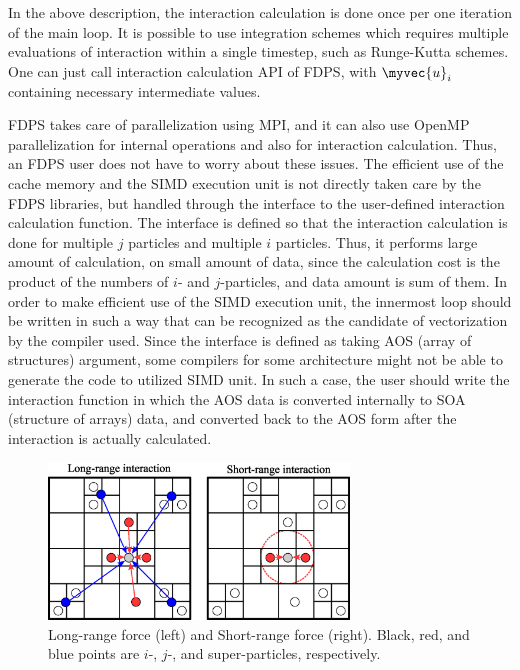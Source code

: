 In the above description, the interaction calculation is done once per
one iteration of the main loop. It is possible to use integration
schemes which requires multiple evaluations of interaction within a
single timestep, such as Runge-Kutta schemes. One can just call
interaction calculation API of FDPS, with $\myvec{u}_i$ containing
necessary intermediate values.

FDPS takes care of parallelization using MPI, and it can also use
OpenMP parallelization for internal operations and also for
interaction calculation. Thus, an FDPS user does not have to worry
about these issues. The efficient use of the cache memory and the SIMD
execution unit is not directly taken care by the FDPS libraries, but
handled through the interface to the user-defined interaction
calculation function. The interface is defined so that the interaction
calculation is done for multiple $j$ particles and multiple $i$
particles. Thus, it performs large amount of calculation, on small
amount of data, since the calculation cost is the product of the
numbers of $i$- and $j$-particles, and data amount is sum of them.
In order to make efficient use of the SIMD execution unit, the
innermost loop should be written in such a way that can be recognized
as the candidate of vectorization by the compiler used. Since the
interface is defined as taking AOS (array of structures) argument,
some compilers for some architecture might not be able to generate the
code to utilized SIMD unit. In such a case, the user should write the
interaction function in which the AOS data is converted internally to
SOA (structure of arrays) data, and converted back to the AOS form
after the interaction is actually calculated. 

\begin{figure}
  \begin{center}
    \includegraphics[width=8cm]{fig/force_type.eps}
  \end{center}
  \caption{Long-range force (left) and Short-range force
    (right). Black, red, and blue points are $i$-, $j$-, and
    super-particles, respectively.}
  \label{fig:forcetype}
\end{figure}


